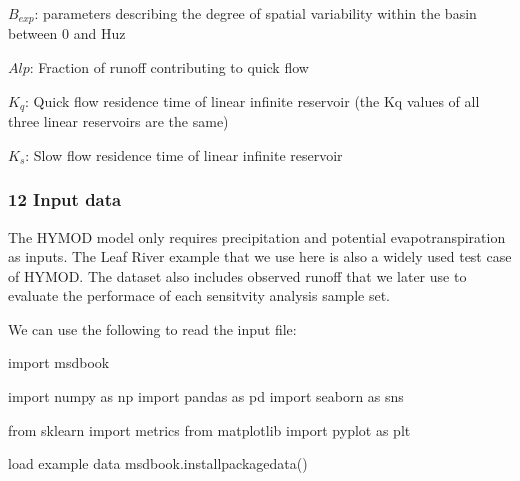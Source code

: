 \documentclass[letterpaper,10pt,english]{book}
\begin{document}
\sphinxAtStartPar
\(B_{exp}\): parameters describing the degree of spatial variability
within the basin between 0 and Huz

\sphinxAtStartPar
\(Alp\): Fraction of runoff contributing to quick flow

\sphinxAtStartPar
\(K_q\): Quick flow residence time of linear infinite reservoir (the
Kq values of all three linear reservoirs are the same)

\sphinxAtStartPar
\(K_s\): Slow flow residence time of linear infinite reservoir


\subsubsection{1\sphinxhyphen{}2 Input data}
\label{\detokenize{A2_Jupyter_Notebooks:input-data}}
\sphinxAtStartPar
The HYMOD model only requires precipitation and potential
evapotranspiration as inputs. The Leaf River example that we use here is
also a widely used test case of HYMOD. The dataset also includes
observed runoff that we later use to evaluate the performace of each
sensitvity analysis sample set.

\sphinxAtStartPar
We can use the following to read the input file:

\begin{sphinxVerbatim}[commandchars=\\\{\}]
import msdbook

import numpy as np
import pandas as pd
import seaborn as sns

from sklearn import metrics
from matplotlib import pyplot as plt

\PYGZsh{} load example data
msdbook.install\PYGZus{}package\PYGZus{}data()
\end{sphinxVerbatim}
\end{document}
